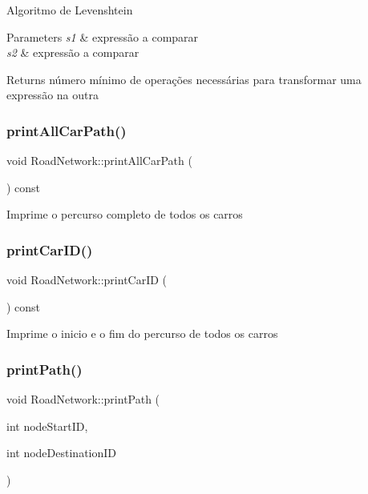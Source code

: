Algoritmo de Levenshtein 
\begin{DoxyParams}{Parameters}
{\em s1} & expressão a comparar \\
\hline
{\em s2} & expressão a comparar \\
\hline
\end{DoxyParams}
\begin{DoxyReturn}{Returns}
número mínimo de operações necessárias para transformar uma expressão na outra 
\end{DoxyReturn}
\mbox{\label{class_road_network_a23597085b3fb2412a3a6a173e8d792fb}} 
\subsubsection{\texorpdfstring{print\+All\+Car\+Path()}{printAllCarPath()}}
{\footnotesize\ttfamily void Road\+Network\+::print\+All\+Car\+Path (\begin{DoxyParamCaption}{ }\end{DoxyParamCaption}) const}

Imprime o percurso completo de todos os carros \mbox{\label{class_road_network_a17723d3dcfae26cc499871334391d9b1}} 
\subsubsection{\texorpdfstring{print\+Car\+I\+D()}{printCarID()}}
{\footnotesize\ttfamily void Road\+Network\+::print\+Car\+ID (\begin{DoxyParamCaption}{ }\end{DoxyParamCaption}) const}

Imprime o inicio e o fim do percurso de todos os carros \mbox{\label{class_road_network_ae48e55423eb4341d38634ecaa2c5f928}} 
\subsubsection{\texorpdfstring{print\+Path()}{printPath()}}
{\footnotesize\ttfamily void Road\+Network\+::print\+Path (\begin{DoxyParamCaption}\item[{int}]{node\+Start\+ID,  }\item[{int}]{node\+Destination\+ID }\end{DoxyParamCaption})}

